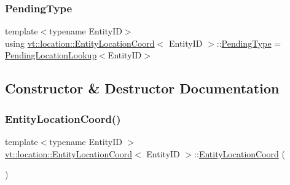 \mbox{\label{structvt_1_1location_1_1_entity_location_coord_a41b5c3792967e089c7e592b705c266c3}} 
\subsubsection{\texorpdfstring{Pending\+Type}{PendingType}}
{\footnotesize\ttfamily template$<$typename Entity\+ID$>$ \\
using \hyperlink{structvt_1_1location_1_1_entity_location_coord}{vt\+::location\+::\+Entity\+Location\+Coord}$<$ Entity\+ID $>$\+::\hyperlink{structvt_1_1location_1_1_entity_location_coord_a41b5c3792967e089c7e592b705c266c3}{Pending\+Type} =  \hyperlink{structvt_1_1location_1_1_pending_location_lookup}{Pending\+Location\+Lookup}$<$Entity\+ID$>$}



\subsection{Constructor \& Destructor Documentation}
\mbox{\label{structvt_1_1location_1_1_entity_location_coord_a84d2166e5a2c192b081c222e15e93882}} 
\subsubsection{\texorpdfstring{Entity\+Location\+Coord()}{EntityLocationCoord()}\hspace{0.1cm}{\footnotesize\ttfamily [1/3]}}
{\footnotesize\ttfamily template$<$typename Entity\+ID $>$ \\
\hyperlink{structvt_1_1location_1_1_entity_location_coord}{vt\+::location\+::\+Entity\+Location\+Coord}$<$ Entity\+ID $>$\+::\hyperlink{structvt_1_1location_1_1_entity_location_coord}{Entity\+Location\+Coord} (\begin{DoxyParamCaption}{ }\end{DoxyParamCaption})}



